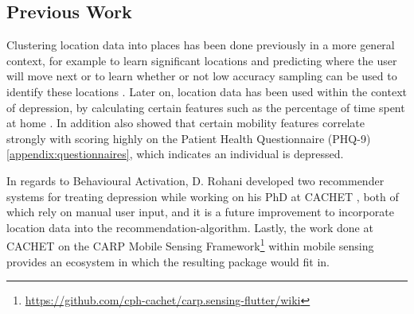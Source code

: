 \subsection{Previous Work}
Clustering location data into places has been done previously in a more general context, for example to learn significant locations and predicting where the user will move next \cite{learning_significant_locations} or to learn whether or not low accuracy sampling can be used to identify these locations \cite{sparse-location-2014}. Later on, location data has been used within the context of depression, by calculating certain features such as the percentage of time spent at home \cite{Saeb2015, Canzian2015}. In addition \cite{Saeb2015} also showed that certain mobility features correlate strongly with scoring highly on the Patient Health Questionnaire (PHQ-9) \ref{appendix:questionnaires}, which indicates an individual is depressed.  

In regards to Behavioural Activation, D. Rohani developed two recommender systems for treating depression while working on his PhD at CACHET \cite{mubs-rohani, moribus}, both of which rely on manual user input, and it is a future improvement to incorporate location data into the recommendation-algorithm. Lastly, the work done at CACHET on the CARP Mobile Sensing Framework\footnote{\url{https://github.com/cph-cachet/carp.sensing-flutter/wiki}} within mobile sensing provides an ecosystem in which the resulting package would fit in.
